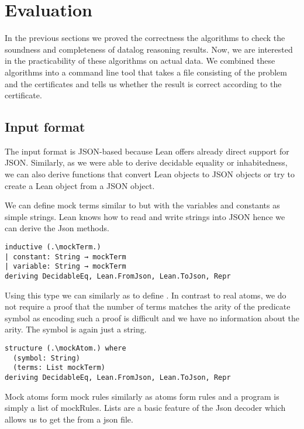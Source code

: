 \section{Evaluation}\label{sec:eval}

In the previous sections we proved the correctness the algorithms to check the soundness and completeness of datalog reasoning results. Now, we are interested in the practicability of these algorithms on actual data. We combined these algorithms into a command line tool that takes a file consisting of the problem and the certificates and tells us whether the result is correct according to the certificate. 

\subsection{Input format}

The input format is JSON-based because Lean offers already direct support for JSON. Similarly, as we were able to derive decidable equality or inhabitedness, we can also derive functions that convert Lean objects to JSON objects or try to create a Lean object from a JSON object.

We can define mock terms similar to \term but with the variables and constants as simple strings. Lean knows how to read and write strings into JSON hence we can derive the Json methods.

\begin{lstlisting}
inductive (.\mockTerm.)
| constant: String → mockTerm
| variable: String → mockTerm
deriving DecidableEq, Lean.FromJson, Lean.ToJson, Repr
\end{lstlisting}

Using this type we can similarly as to \atom define \mockAtom. In contrast to real atoms, we do not require a proof that the number of terms matches the arity of the predicate symbol as encoding such a proof is difficult and we have no information about the arity. The symbol is again just a string.

\begin{lstlisting}
structure (.\mockAtom.) where
  (symbol: String)
  (terms: List mockTerm)
deriving DecidableEq, Lean.FromJson, Lean.ToJson, Repr
\end{lstlisting}

Mock atoms form mock rules similarly as atoms form rules and a program is simply a list of mockRules. Lists are a basic feature of the Json decoder which allows us to get the from a json file. 

